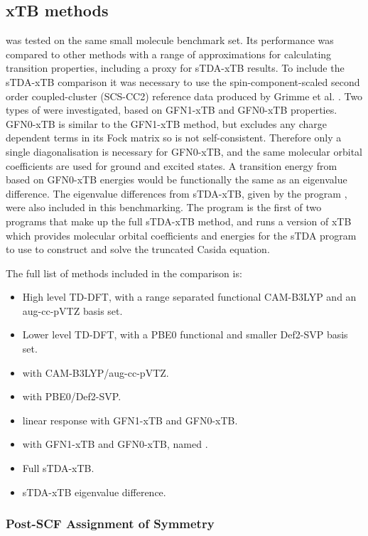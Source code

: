 \afterpartskip
\subsection{xTB methods}
\label{subsec:dscf_gfn_tests}
\dxtb was tested on the same small molecule benchmark set. Its performance was compared
to other methods with a range of approximations for calculating transition properties, 
including a proxy for sTDA-xTB results. To include the sTDA-xTB comparison it was
necessary to use the spin-component-scaled second order coupled-cluster (SCS-CC2)
\cite{Hattig2000, Hellweg2008} reference data produced by Grimme et al. \cite{Grimme2016}.
Two types of \dxtb were investigated, based on GFN1-xTB and GFN0-xTB properties.
GFN0-xTB is similar to the GFN1-xTB method, but excludes any charge dependent terms
in its Fock matrix so is not self-consistent. Therefore only a single diagonalisation
is necessary for GFN0-xTB, and the same molecular orbital coefficients are used for
ground and excited states. A transition energy from \dscf based on GFN0-xTB energies
would be functionally the same as an eigenvalue difference.
The eigenvalue differences from sTDA-xTB, given by the  program
\cite{Grimme2016}, were also included in this benchmarking. The  
program is the first of two programs that make up the full sTDA-xTB method, and 
runs a version of xTB which provides molecular orbital coefficients and energies
for the sTDA program to use to construct and solve the truncated Casida equation.

The full list of methods included in the comparison is:
\begin{itemize}
    \item High level TD-DFT, with a range separated functional CAM-B3LYP and
     an aug-cc-pVTZ basis set.
    \item Lower level TD-DFT, with a PBE0 functional and smaller Def2-SVP basis set.
    \item \dscf with CAM-B3LYP/aug-cc-pVTZ.
    \item \dscf with PBE0/Def2-SVP.
    \item linear response with GFN1-xTB and GFN0-xTB.
    \item \dscf with GFN1-xTB and GFN0-xTB, named \dxtb.
    \item Full sTDA-xTB.
    \item sTDA-xTB eigenvalue difference.
\end{itemize}
 
\subsubsection{Post-SCF Assignment of Symmetry}
\label{subsubsec:post_scf_symmetry}

